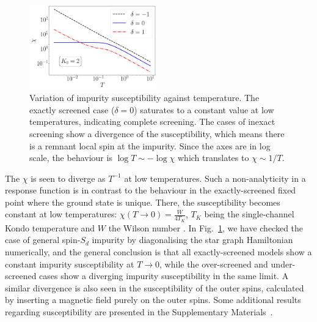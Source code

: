 \documentclass{iopart}
\begin{document}
\begin{figure}[!htpb]
\centering
\includegraphics[width=0.49\textwidth]{CentralFieldChiPowerlaw.pdf}
\caption{Variation of impurity susceptibility against temperature. The exactly screened case ($\delta=0$) saturates to a constant value at low temperatures, indicating complete screening. The cases of inexact screening show a divergence of the susceptibility, which means there is a remnant local spin at the impurity. Since the axes are in log scale, the behaviour is $\log T \sim -\log \chi$ which translates to $\chi \sim 1/T$.  }
\label{fig:suseptibility_impurity}
\end{figure}

The \(\chi\) is seen to diverge as \(T^{-1}\) at low temperatures.
Such a non-analyticity in a response function is in contrast to the behaviour in the exactly-screened fixed point where the ground state is unique.
There, the susceptibility becomes constant at low temperatures: \(\chi(T\to 0) = \frac{W}{4 T_K}\), \(T_K\) being the single-channel Kondo temperature and \(W\) the Wilson number \cite{wilson1975renormalization,nozieres1974fermi,bullaNRGreview,kondo_urg}.
In Fig.~\ref{fig:suseptibility_impurity}, we have checked the case of general spin-\(S_{d}\) impurity by diagonalising the star graph Hamiltonian numerically, and the general conclusion is that all exactly-screened models show a constant impurity susceptibility at \(T \to 0\), while the over-screened and under-screened cases show a diverging impurity susceptibility in the same limit.
A similar divergence is also seen in the susceptibility of the outer spins, calculated by inserting a magnetic field purely on the outer spins. Some additional results regarding susceptibility are presented in the Supplementary Materials~\cite{SM}.
\end{document}
